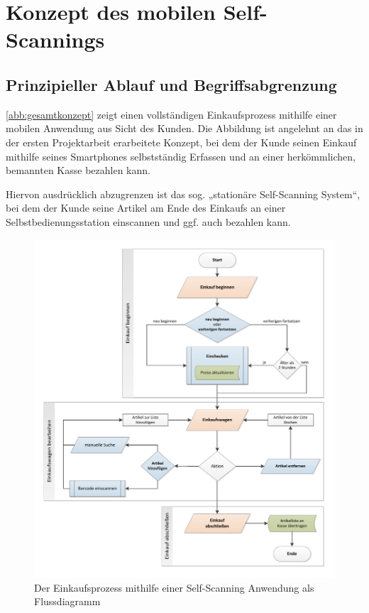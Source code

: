 \section{Konzept des mobilen Self-Scannings}
\subsection{Prinzipieller Ablauf und Begriffsabgrenzung}\label{prinzipieller-ablauf}
\vref*{abb:gesamtkonzept} zeigt einen vollständigen Einkaufsprozess mithilfe einer mobilen Anwendung aus Sicht des Kunden. Die Abbildung ist angelehnt an das in der ersten Projektarbeit erarbeitete Konzept, bei dem der Kunde seinen Einkauf mithilfe seines Smartphones selbstständig Erfassen und an einer herkömmlichen, bemannten Kasse bezahlen kann.

Hiervon ausdrücklich abzugrenzen ist das sog. „stationäre Self-Scanning System“, bei dem der Kunde seine Artikel am Ende des Einkaufs an einer Selbstbedienungsstation einscannen und ggf. auch bezahlen kann.

\begin{figure}[H]
\includegraphics[width=\linewidth]{res/ablaufdiagramm_v2.pdf}
\caption{Der Einkaufsprozess mithilfe einer Self-Scanning Anwendung als Flussdiagramm}\label{abb:gesamtkonzept}
\end{figure}

